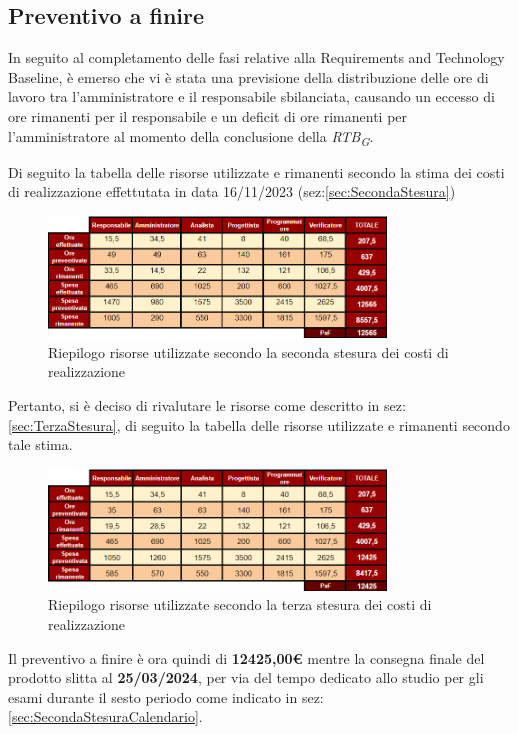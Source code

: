 \subsection{Preventivo a finire}
In seguito al completamento delle fasi relative alla Requirements and Technology Baseline, è emerso che vi è stata una previsione della distribuzione delle ore di lavoro tra l'amministratore e il responsabile sbilanciata, causando un eccesso di ore rimanenti per il responsabile e un deficit di ore rimanenti per l'amministratore al momento della conclusione della \textit{RTB}\textsubscript{\textit{G}}.

Di seguito la tabella delle risorse utilizzate e rimanenti secondo la stima dei costi di realizzazione effettutata in data 16/11/2023 (sez:\ref{sec:SecondaStesura})
\begin{figure}[H]
    \centering
    \includegraphics[width=0.8\textwidth]{../Images/PaF1stesura.PNG}
    \caption{Riepilogo risorse utilizzate secondo la seconda stesura dei costi di realizzazione}
    \label{fig:RisorseRimanentiRTB}
\end{figure}

Pertanto, si è deciso di rivalutare le risorse come descritto in sez:\ref{sec:TerzaStesura},
di seguito la tabella delle risorse utilizzate e rimanenti secondo tale stima.

\begin{figure}[H]
    \centering
    \includegraphics[width=0.8\textwidth]{../Images/PaF2stesura.PNG}
    \caption{Riepilogo risorse utilizzate secondo la terza stesura dei costi di realizzazione}
    \label{fig:RisorseRimanentiRTB2}
\end{figure}    
Il preventivo a finire è ora quindi di \textbf{12425,00€} mentre la consegna finale del prodotto slitta al \textbf{25/03/2024}, per via del tempo dedicato allo studio per gli esami durante il sesto periodo come indicato in sez:\ref{sec:SecondaStesuraCalendario}.

